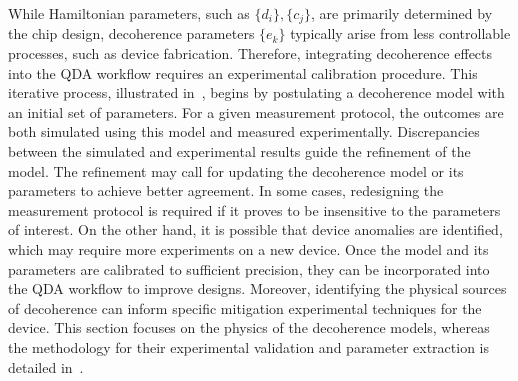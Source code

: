 \documentclass[a4paper,onecolumn,11pt,unpublished]{quantumarticle}
\newcommand{\setelem}[1]{\ensuremath{\{#1\}}}
\newcommand{\setelemtwo}[2]{\setelem{#1},\setelem{#2}}
\begin{document}
While Hamiltonian parameters, such as $\setelemtwo{d_i}{c_j}$, are primarily determined by the chip design, decoherence parameters $\setelem{e_k}$ typically arise from less controllable processes, such as device fabrication. Therefore, integrating decoherence effects into the QDA workflow requires an experimental calibration procedure. This iterative process, illustrated in~, begins by postulating a decoherence model with an initial set of parameters. For a given measurement protocol, the outcomes are both simulated using this model and measured experimentally. Discrepancies between the simulated and experimental results guide the refinement of the model.  The refinement may call for updating the decoherence model or its parameters to achieve better agreement. In some cases, redesigning the measurement protocol is required if it proves to be insensitive to the parameters of interest.  On the other hand, it is possible that device anomalies are identified, which may require more experiments on a new device. Once the model and its parameters are calibrated to sufficient precision, they can be incorporated into the QDA workflow to improve designs. Moreover, identifying the physical sources of decoherence can inform specific mitigation experimental techniques for the device. This section focuses on the physics of the decoherence models, whereas the methodology for their experimental validation and parameter extraction is detailed in~.
\end{document}
